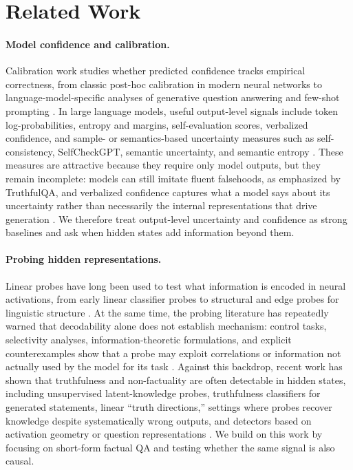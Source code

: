 \documentclass{article}
\begin{document}
\section{Related Work}

\paragraph{Model confidence and calibration.}

Calibration work studies whether predicted confidence tracks empirical correctness, from classic post-hoc calibration in modern neural networks to language-model-specific analyses of generative question answering and few-shot prompting \cite{Guo2017Calibration,jiang-etal-2021-know,zhao2021calibrate}. In large language models, useful output-level signals include token log-probabilities, entropy and margins, self-evaluation scores, verbalized confidence, and sample- or semantics-based uncertainty measures such as self-consistency, SelfCheckGPT, semantic uncertainty, and semantic entropy \cite{Kadavath2022LanguageKnow,Lin2022TruthfulQA:Falsehoods,manakul2023selfcheckgpt,tian2023just,xiong2024can}. These measures are attractive because they require only model outputs, but they remain incomplete: models can still imitate fluent falsehoods, as emphasized by TruthfulQA, and verbalized confidence captures what a model says about its uncertainty rather than necessarily the internal representations that drive generation \cite{Lin2022TruthfulQA:Falsehoods}. We therefore treat output-level uncertainty and confidence as strong baselines and ask when hidden states add information beyond them. 

\paragraph{Probing hidden representations.}

Linear probes have long been used to test what information is encoded in neural activations, from early linear classifier probes to structural and edge probes for linguistic structure \cite{Alain2017UnderstandingRepresentations, Hewitt2019DesigningProbes, tenney2019you}. At the same time, the probing literature has repeatedly warned that decodability alone does not establish mechanism: control tasks, selectivity analyses, information-theoretic formulations, and explicit counterexamples show that a probe may exploit correlations or information not actually used by the model for its task \cite{Hewitt2019DesigningProbes, pimentel-etal-2020-information, ravichander-etal-2021-probing, belinkov2022probing}. Against this backdrop, recent work has shown that truthfulness and non-factuality are often detectable in hidden states, including unsupervised latent-knowledge probes, truthfulness classifiers for generated statements, linear “truth directions,” settings where probes recover knowledge despite systematically wrong outputs, and detectors based on activation geometry or question representations \cite{Burns2024DiscoveringSupervision,Azaria2023TheLying, Marks2024TheDatasets,mallen2023not}. We build on this work by focusing on short-form factual QA and testing whether the same signal is also causal. 
\end{document}
